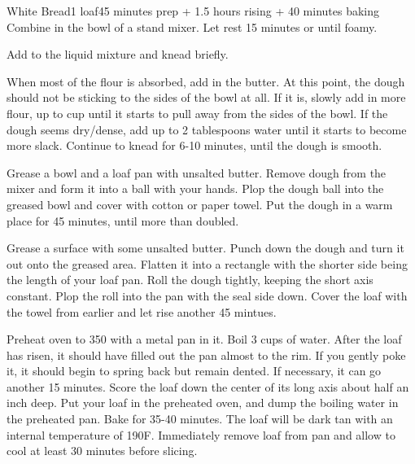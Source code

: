 \documentclass[../Cookbook.tex]{subfiles}
\begin{document}
\begin{recipe}[WhiteBread]{White Bread}{1 loaf}{45 minutes prep + 1.5 hours rising + 40 minutes baking}
Combine in the bowl of a stand mixer. Let rest 15 minutes or until foamy.

Add to the liquid mixture and knead briefly.

When most of the flour is absorbed, add in the butter.
At this point, the dough should not be sticking to the sides of the bowl at all.
If it is, slowly add in more flour, up to  cup until it starts to pull away from the sides of the bowl.
If the dough seems dry/dense, add up to 2 tablespoons water until it starts to become more slack.
Continue to knead for 6-10 minutes, until the dough is smooth.

Grease a bowl and a loaf pan with unsalted butter.
Remove dough from the mixer and form it into a ball with your hands.
Plop the dough ball into the greased bowl and cover with cotton or paper towel.
Put the dough in a warm place for 45 minutes, until more than doubled.

Grease a surface with some unsalted butter.
Punch down the dough and turn it out onto the greased area.
Flatten it into a rectangle with the shorter side being the length of your loaf pan.
Roll the dough tightly, keeping the short axis constant.
Plop the roll into the pan with the seal side down.
Cover the loaf with the towel from earlier and let rise another 45 mintues.

Preheat oven to 350 with a metal pan in it.
Boil 3 cups of water.
After the loaf has risen, it should have filled out the pan almost to the rim.
If you gently poke it, it should begin to spring back but remain dented.
If necessary, it can go another 15 minutes.
Score the loaf down the center of its long axis about half an inch deep.
Put your loaf in the preheated oven, and dump the boiling water in the preheated pan.
Bake for 35-40 minutes.
The loaf will be dark tan with an internal temperature of 190\0F.
Immediately remove loaf from pan and allow to cool at least 30 minutes before slicing.

\end{recipe}
\end{document}
